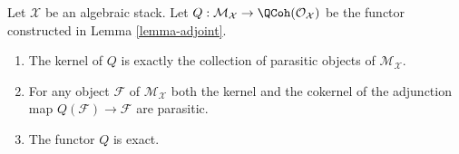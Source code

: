 \begin{lemma}
\label{lemma-adjoint-kernel-parasitic}
Let $\mathcal{X}$ be an algebraic stack.
Let $Q : \mathcal{M}_\mathcal{X} \to \QCoh(\mathcal{O}_\mathcal{X})$
be the functor constructed in Lemma \ref{lemma-adjoint}.
\begin{enumerate}
\item The kernel of $Q$ is exactly the collection of parasitic objects
of $\mathcal{M}_\mathcal{X}$.
\item For any object $\mathcal{F}$
of $\mathcal{M}_\mathcal{X}$ both the kernel and the cokernel of the
adjunction map $Q(\mathcal{F}) \to \mathcal{F}$ are parasitic.
\item The functor $Q$ is exact.
\end{enumerate}
\end{lemma}

